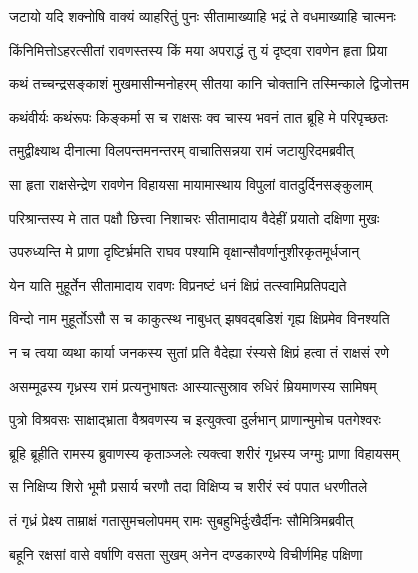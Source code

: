 \twolineshloka
{जटायो यदि शक्नोषि वाक्यं व्याहरितुं पुनः}
{सीतामाख्याहि भद्रं ते वधमाख्याहि चात्मनः} %

\twolineshloka
{किंनिमित्तोऽहरत्सीतां रावणस्तस्य किं मया}
{अपराद्धं तु यं दृष्ट्वा रावणेन हृता प्रिया} %

\twolineshloka
{कथं तच्चन्द्रसङ्काशं मुखमासीन्मनोहरम्}
{सीतया कानि चोक्तानि तस्मिन्काले द्विजोत्तम} %

\twolineshloka
{कथंवीर्यः कथंरूपः किङ्कर्मा स च राक्षसः}
{क्व चास्य भवनं तात ब्रूहि मे परिपृच्छतः} %

\twolineshloka
{तमुद्वीक्ष्याथ दीनात्मा विलपन्तमनन्तरम्}
{वाचातिसन्नया रामं जटायुरिदमब्रवीत्} %

\twolineshloka
{सा हृता राक्षसेन्द्रेण रावणेन विहायसा}
{मायामास्थाय विपुलां वातदुर्दिनसङ्कुलाम्} %

\twolineshloka
{परिश्रान्तस्य मे तात पक्षौ छित्त्वा निशाचरः}
{सीतामादाय वैदेहीं प्रयातो दक्षिणा मुखः} %

\twolineshloka
{उपरुध्यन्ति मे प्राणा दृष्टिर्भ्रमति राघव}
{पश्यामि वृक्षान्सौवर्णानुशीरकृतमूर्धजान्} %

\twolineshloka
{येन याति मुहूर्तेन सीतामादाय रावणः}
{विप्रनष्टं धनं क्षिप्रं तत्स्वामिप्रतिपद्यते} %

\twolineshloka
{विन्दो नाम मुहूर्तोऽसौ स च काकुत्स्थ नाबुधत्}
{झषवद्बडिशं गृह्य क्षिप्रमेव विनश्यति} %

\twolineshloka
{न च त्वया व्यथा कार्या जनकस्य सुतां प्रति}
{वैदेह्या रंस्यसे क्षिप्रं हत्वा तं राक्षसं रणे} %

\twolineshloka
{असम्मूढस्य गृध्रस्य रामं प्रत्यनुभाषतः}
{आस्यात्सुस्राव रुधिरं म्रियमाणस्य सामिषम्} %

\twolineshloka
{पुत्रो विश्रवसः साक्षाद्भ्राता वैश्रवणस्य च}
{इत्युक्त्वा दुर्लभान् प्राणान्मुमोच पतगेश्वरः} %

\twolineshloka
{ब्रूहि ब्रूहीति रामस्य ब्रुवाणस्य कृताञ्जलेः}
{त्यक्त्वा शरीरं गृध्रस्य जग्मुः प्राणा विहायसम्} %

\twolineshloka
{स निक्षिप्य शिरो भूमौ प्रसार्य चरणौ तदा}
{विक्षिप्य च शरीरं स्वं पपात धरणीतले} %

\twolineshloka
{तं गृध्रं प्रेक्ष्य ताम्राक्षं गतासुमचलोपमम्}
{रामः सुबहुभिर्दुःखैर्दीनः सौमित्रिमब्रवीत्} %

\twolineshloka
{बहूनि रक्षसां वासे वर्षाणि वसता सुखम्}
{अनेन दण्डकारण्ये विचीर्णमिह पक्षिणा} %

